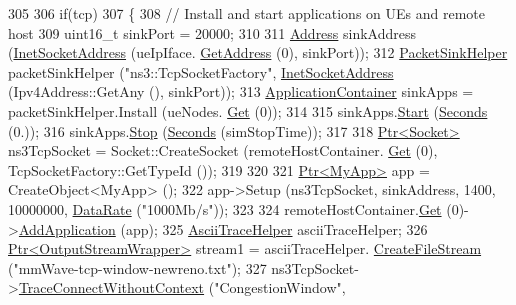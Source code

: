 \begin{DoxyCode}
305 
306         \textcolor{keywordflow}{if}(tcp)
307         \{
308                 \textcolor{comment}{// Install and start applications on UEs and remote host}
309                 uint16\_t sinkPort = 20000;
310 
311                 \hyperlink{classns3_1_1Address}{Address} sinkAddress (\hyperlink{classns3_1_1InetSocketAddress}{InetSocketAddress} (ueIpIface.
      \hyperlink{classns3_1_1Ipv4InterfaceContainer_ae63208dcd222be986822937ee4aa828c}{GetAddress} (0), sinkPort));
312                 \hyperlink{classns3_1_1PacketSinkHelper}{PacketSinkHelper} packetSinkHelper (\textcolor{stringliteral}{"ns3::TcpSocketFactory"}, 
      \hyperlink{classns3_1_1InetSocketAddress}{InetSocketAddress} (Ipv4Address::GetAny (), sinkPort));
313                 \hyperlink{classns3_1_1ApplicationContainer}{ApplicationContainer} sinkApps = packetSinkHelper.Install (ueNodes.
      \hyperlink{classns3_1_1NodeContainer_a9ed96e2ecc22e0f5a3d4842eb9bf90bf}{Get} (0));
314 
315                 sinkApps.\hyperlink{classns3_1_1ApplicationContainer_a8eff87926507020bbe3e1390358a54a7}{Start} (\hyperlink{group__timecivil_ga33c34b816f8ff6628e33d5c8e9713b9e}{Seconds} (0.));
316                 sinkApps.\hyperlink{classns3_1_1ApplicationContainer_adfc52f9aa4020c8714679b00bbb9ddb3}{Stop} (\hyperlink{group__timecivil_ga33c34b816f8ff6628e33d5c8e9713b9e}{Seconds} (simStopTime));
317 
318                 \hyperlink{classns3_1_1Ptr}{Ptr<Socket>} ns3TcpSocket = Socket::CreateSocket (remoteHostContainer.
      \hyperlink{classns3_1_1NodeContainer_a9ed96e2ecc22e0f5a3d4842eb9bf90bf}{Get} (0), TcpSocketFactory::GetTypeId ());
319 
320 
321                 \hyperlink{classns3_1_1Ptr}{Ptr<MyApp>} app = CreateObject<MyApp> ();
322                 app->Setup (ns3TcpSocket, sinkAddress, 1400, 10000000, \hyperlink{classns3_1_1DataRate}{DataRate} (\textcolor{stringliteral}{"1000Mb/s"}));
323 
324                 remoteHostContainer.\hyperlink{classns3_1_1NodeContainer_a9ed96e2ecc22e0f5a3d4842eb9bf90bf}{Get} (0)->\hyperlink{classns3_1_1Node_ab98b4fdc4aadc86366b80e8a79a53f47}{AddApplication} (app);
325                 \hyperlink{classns3_1_1AsciiTraceHelper}{AsciiTraceHelper} asciiTraceHelper;
326                 \hyperlink{classns3_1_1Ptr}{Ptr<OutputStreamWrapper>} stream1 = asciiTraceHelper.
      \hyperlink{classns3_1_1AsciiTraceHelper_a44960bf2ca32835024eaedd26d1c4f94}{CreateFileStream} (\textcolor{stringliteral}{"mmWave-tcp-window-newreno.txt"});
327                 ns3TcpSocket->\hyperlink{classns3_1_1ObjectBase_a1be45f6fd561e75dcac9dfa81b2b81e4}{TraceConnectWithoutContext} (\textcolor{stringliteral}{"CongestionWindow"}, 

\end{DoxyCode}
